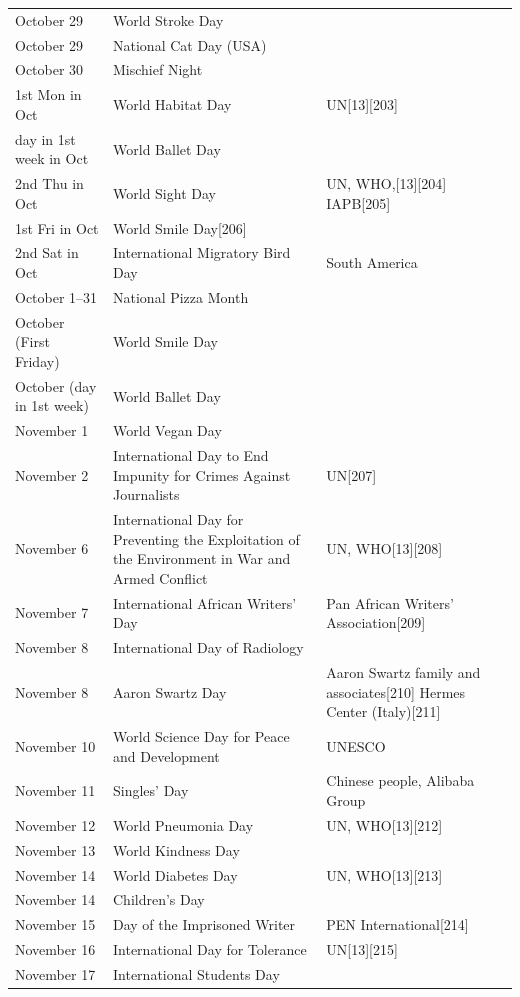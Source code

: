 \documentclass[
  openany]{book}
\begin{document}
\begin{longtable}[t]{>{\raggedright\arraybackslash}p{8em}>{\raggedright\arraybackslash}p{20em}>{\raggedright\arraybackslash}p{12em}}
October 29 & World Stroke Day & \\
\addlinespace
October 29 & National Cat Day (USA) & \\
October 30 & Mischief Night & \\
1st Mon in Oct & World Habitat Day & UN[13][203]\\
day in 1st week in Oct & World Ballet Day & \\
2nd Thu in Oct & World Sight Day & UN, WHO,[13][204] IAPB[205]\\
\addlinespace
1st Fri in Oct & World Smile Day[206] & \\
2nd Sat in Oct & International Migratory Bird Day & South America\\
October 1–31 & National Pizza Month & \\
October (First Friday) & World Smile Day & \\
October (day in 1st week) & World Ballet Day & \\
\addlinespace
November 1 & World Vegan Day & \\
November 2 & International Day to End Impunity for Crimes Against Journalists & UN[207]\\
November 6 & International Day for Preventing the Exploitation of the Environment in War and Armed Conflict & UN, WHO[13][208]\\
November 7 & International African Writers' Day & Pan African Writers' Association[209]\\
November 8 & International Day of Radiology & \\
\addlinespace
November 8 & Aaron Swartz Day & Aaron Swartz family and associates[210] Hermes Center (Italy)[211]\\
November 10 & World Science Day for Peace and Development & UNESCO\\
November 11 & Singles' Day & Chinese people, Alibaba Group\\
November 12 & World Pneumonia Day & UN, WHO[13][212]\\
November 13 & World Kindness Day & \\
\addlinespace
November 14 & World Diabetes Day & UN, WHO[13][213]\\
November 14 & Children's Day & \\
November 15 & Day of the Imprisoned Writer & PEN International[214]\\
November 16 & International Day for Tolerance & UN[13][215]\\
November 17 & International Students Day & \\

\end{longtable}
\end{document}
